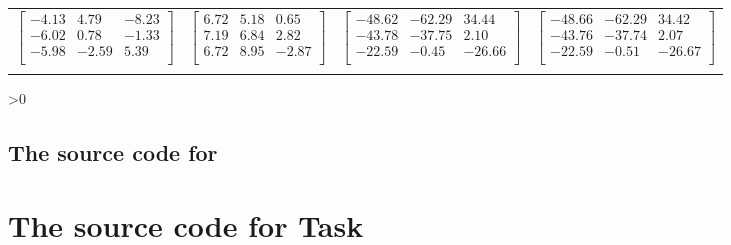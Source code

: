 \documentclass[12pt,a4paper,onesided]{report}
\newcommand{\source}{\pagebreak
	\ifnum\value{section}>0
		\subsection{The source code for \thesection}

	\else
		\section{The source code for Task \thechapter}

	\fi
	}
\begin{document}
\begin{table}[h]
{\begin{tabular}{cccc}
				$\begin{bmatrix}-4.13&4.79&-8.23\\-6.02&0.78&-1.33\\-5.98&-2.59&5.39\\\end{bmatrix}$&
				$\begin{bmatrix}6.72&5.18&0.65\\7.19&6.84&2.82\\6.72&8.95&-2.87\\\end{bmatrix}$&
				$\begin{bmatrix}-48.62&-62.29&34.44\\-43.78&-37.75&2.10\\-22.59&-0.45&-26.66\\\end{bmatrix}$&
				$\begin{bmatrix}-48.66&-62.29&34.42\\-43.76&-37.74&2.07\\-22.59&-0.51&-26.67\\\end{bmatrix}$
			\\	&&&	\\
			\bottomrule
		\end{tabular}
	}
\end{table}
\source

\end{document}
